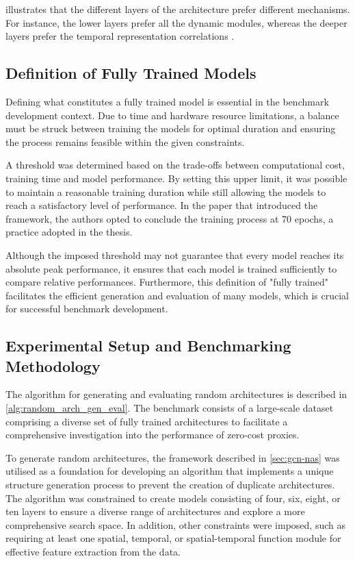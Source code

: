  illustrates that the different layers of the architecture prefer different mechanisms. For instance, the lower layers prefer all the dynamic modules, whereas the deeper layers prefer the temporal representation correlations \autocite{peng2020learning}. 

\subsection{Definition of Fully Trained Models}\label{sec:full_trained}

Defining what constitutes a fully trained model is essential in the benchmark development context. Due to time and hardware resource limitations, a balance must be struck between training the models for optimal duration and ensuring the process remains feasible within the given constraints. 

A threshold was determined based on the trade-offs between computational cost, training time and model performance. By setting this upper limit, it was possible to maintain a reasonable training duration while still allowing the models to reach a  satisfactory level of performance. In the paper that introduced the framework, the authors \autocite{peng2020learning} opted to conclude the training process at 70 epochs, a practice adopted in the thesis.

Although the imposed threshold may not guarantee that every model reaches its absolute peak performance, it ensures that each model is trained sufficiently to compare relative performances. Furthermore, this definition of "fully trained" facilitates the efficient generation and evaluation of many models, which is crucial for successful benchmark development.




\subsection{Experimental Setup and Benchmarking Methodology}\label{subsec:experimentalsetup}

The algorithm for generating and evaluating random architectures is described in \cref{alg:random_arch_gen_eval}. The benchmark consists of a large-scale dataset comprising a diverse set of fully trained architectures to facilitate a comprehensive investigation into the performance of zero-cost proxies.

To generate random architectures, the framework described in \cref{sec:gcn-nas} was utilised as a foundation for developing an algorithm that implements a unique structure generation process to prevent the creation of duplicate architectures. The algorithm was constrained to create models consisting of four, six, eight, or ten layers to ensure a diverse range of architectures and explore a more comprehensive search space. In addition, other constraints were imposed, such as requiring at least one spatial, temporal, or spatial-temporal function module for effective feature extraction from the data.


